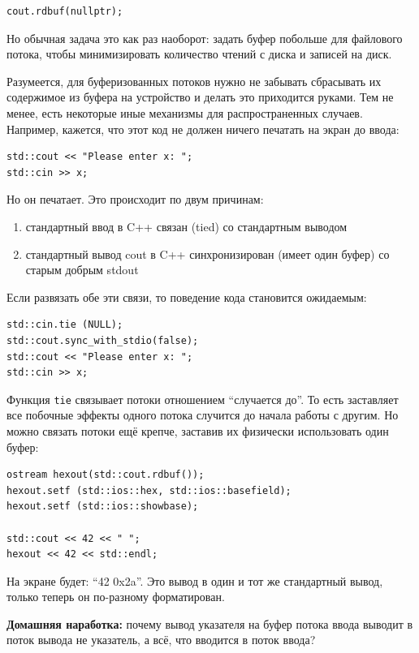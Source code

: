 \documentclass[a4paper,12pt,oneside]{article}
\begin{document}
\begin{lstlisting}
cout.rdbuf(nullptr);
\end{lstlisting}

Но обычная задача это как раз наоборот: задать буфер побольше для файлового потока, чтобы минимизировать количество чтений с диска и записей на диск.

Разумеется, для буферизованных потоков нужно не забывать сбрасывать их содержимое из буфера на устройство и делать это приходится руками. Тем не менее, есть некоторые иные механизмы для распространенных случаев. Например, кажется, что этот код не должен ничего печатать на экран до ввода:

\begin{lstlisting}
std::cout << "Please enter x: ";
std::cin >> x;
\end{lstlisting}

Но он печатает. Это происходит по двум причинам:

\begin{enumerate}
\item стандартный ввод в C++ связан (tied) со стандартным выводом
\item стандартный вывод cout в C++ синхронизирован (имеет один буфер) со старым добрым stdout
\end{enumerate}

Если развязать обе эти связи, то поведение кода становится ожидаемым:

\begin{lstlisting}
std::cin.tie (NULL);
std::cout.sync_with_stdio(false);
std::cout << "Please enter x: ";
std::cin >> x;
\end{lstlisting}

Функция \lstinline!tie! связывает потоки отношением ``случается до''. То есть заставляет все побочные эффекты одного потока случится до начала работы с другим. Но можно связать потоки ещё крепче, заставив их физически использовать один буфер:

\begin{lstlisting}
ostream hexout(std::cout.rdbuf());
hexout.setf (std::ios::hex, std::ios::basefield);
hexout.setf (std::ios::showbase);

std::cout << 42 << " ";
hexout << 42 << std::endl;
\end{lstlisting}

На экране будет: ``42 0x2a''. Это вывод в один и тот же стандартный вывод, только теперь он по-разному форматирован.

\textbf{Домашняя наработка:} почему вывод указателя на буфер потока ввода выводит в поток вывода не указатель, а всё, что вводится в поток ввода?
\end{document}
